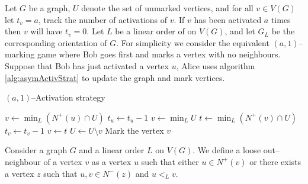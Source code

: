 
\begin{definition} 
    Let $G$ be a graph, $U$ denote the set of unmarked vertices, and for all $v\in V(G)$ let $t_v=a$, track the number of activations of $v$. If $v$ has been activated $a$ times then $v$ will have $t_v=0$. Let $L$ be a linear order of on $V(G)$, and let $G_L$ be the corresponding orientation of $G$. %
    For simplicity we consider the equivalent $(a,1)$--marking game where Bob goes first and marks a vertex with no neighbours. Suppose that Bob has just activated a vertex $u$, Alice uses algorithm \ref{alg:asymActivStrat} to update the graph and mark vertices.
    \begin{algorithm}[h]
        \caption{$(a,1)$--Activation strategy}
        \label{alg:asymActivStrat}
        \begin{algorithmic}[1]
            \Statex
                    \State $v\gets \min_L (N^+(u)\cap U)$ %
                    \State $t_u \gets t_u-1$
                    \Else 
                    \State $v\gets \min_L U$                  
                \EndIf
                    \State $t\gets \min_L (N^+(v)\cap U)$ %
                    \State $t_v \gets t_v-1$
                    \State $v\gets t$
                \EndWhile
                \State $U \gets U \setminus v$
                \State Mark the vertex $v$
            \EndFor
        \end{algorithmic}
    \end{algorithm}
\end{definition}

    Consider a graph $G$ and a linear order $L$ on $V(G)$. We define a loose out--neighbour of a vertex $v$ as a vertex $u$ such that either $u\in N^+(v)$ or there exists a vertex $z$ such that $u,v\in N^-(z)$ and $u<_L v$. 
    
